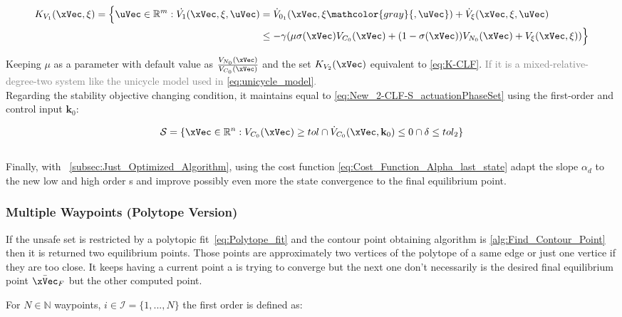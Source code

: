 \begin{align}
    K_{V_{1}}(\xVec, \xi) = \Bigl\{\uVec \in \mathbb{R}^m: \dot{V_{1}}(\xVec, \xi, \uVec) &= \dot{V}_{0_1}(\xVec, \xi \mathcolor{gray}{, \uVec}) + \dot{V}_{\xi}(\xVec, \xi, \uVec) \notag \\
    &\leq -\gamma( \mu \sigma(\xVec) V_{C_0}(\xVec) + (1 - \sigma(\xVec))V_{N_0}(\xVec) + V_{\xi}(\xVec, \xi))\Bigr\}
    \label{eq:HH_2-CLF-S_Constraint}
\end{align}

Keeping \(\mu\) as a parameter with default value as \( \frac{V_{N_0}(\xVec)}{V_{C_0}(\xVec)} \) and the set \(K_{V_{2}}(\xVec)\) equivalent to \eqref{eq:K-CLF}. \textcolor{gray}{If it is a mixed-relative-degree-two system like the unicycle model used in \eqref{eq:unicycle_model}.} \\

Regarding the stability objective changing condition, it maintains equal to \eqref{eq:New_2-CLF-S_actuationPhaseSet} using the first-order  and control input \(\mathbf{k}_0\):

\begin{equation}
    \mathcal{S} = \{\xVec \in \mathbb{R}^n: V_{C_0}(\xVec) \geq tol \cap \dot{V}_{C_0}(\xVec, \mathbf{k}_0) \leq 0 \cap \delta \leq tol_2 \}
    \label{eq:HH_New_2-CLF-S_actuationPhaseSet}
\end{equation}\\


Finally, with ~\ref{subsec:Just_Optimized_Algorithm}, using the cost function \eqref{eq:Cost_Function_Alpha_last_state} adapt the  slope \(\alpha_d\) to the new low and high order s and improve possibly even more the state convergence to the final equilibrium point.\\

\subsubsection{Multiple Waypoints (Polytope Version)}
\label{subsubsubsec:CLFs_Summed_Algorithm_multiple_waypoints}

If the unsafe set is restricted by a polytopic fit~\eqref{eq:Polytope_fit} and the contour point obtaining algorithm is \ref{alg:Find_Contour_Point} then it is returned two equilibrium points. Those points are approximately two vertices of the polytope of a same edge or just one vertice if they are too close.  It keeps having a current point a  is trying to converge but the next one don't necessarily is the desired final equilibrium point \(\bar{\xVec}_F\) but the other computed point.\par
For \(N \in \mathbb{N}\) waypoints, \(i \in \mathcal{I}=\{1,...,N\}\) the first order  is defined as:

